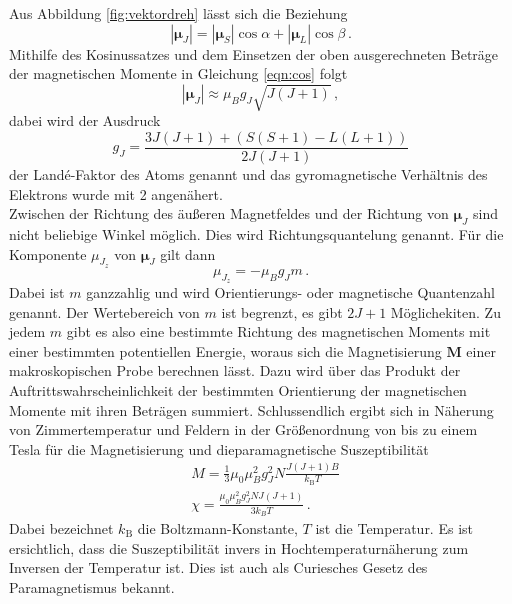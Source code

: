 Aus Abbildung \ref{fig:vektordreh} lässt sich die Beziehung
\begin{equation}
  |\symbf{\mu}_J| = |\symbf{\mu}_S| \cos\alpha + |\symbf{\mu}_L| \cos\beta\,.
  \label{eqn:cos}
\end{equation}
Mithilfe des Kosinussatzes und dem Einsetzen der oben ausgerechneten Beträge der magnetischen Momente in Gleichung
\ref{eqn:cos} folgt
\begin{equation}
  |\symbf{\mu}_J| \approx \mu_B g_J \sqrt{J(J+1)}\,,
\end{equation}
dabei wird der Ausdruck
\begin{equation}
  g_J = \frac{3J(J+1) + (S(S+1)-L(L+1))}{2J(J+1)}
  \label{eqn:lande}
\end{equation}
der Landé-Faktor des Atoms genannt und das gyromagnetische Verhältnis des Elektrons wurde
mit 2 angenähert. \\
Zwischen der Richtung des äußeren Magnetfeldes und der Richtung von $\symbf{\mu}_J$
sind nicht beliebige Winkel möglich. Dies wird Richtungsquantelung genannt. Für die Komponente
$\mu_{J_z}$ von $\symbf{\mu}_J$ gilt dann
\begin{equation}
  \mu_{J_z} = - \mu_B g_J m\,.
\end{equation}
Dabei ist $m$ ganzzahlig und wird Orientierungs- oder magnetische Quantenzahl genannt.
Der Wertebereich von $m$ ist begrenzt, es gibt $2J+1$ Möglichekiten. Zu jedem $m$ gibt es also eine bestimmte Richtung
des magnetischen Moments mit einer bestimmten potentiellen Energie, woraus sich die
Magnetisierung $\symbf{M}$ einer makroskopischen Probe berechnen lässt.
Dazu wird über das Produkt der Auftrittswahrscheinlichkeit der bestimmten
Orientierung der magnetischen Momente mit ihren Beträgen summiert.
Schlussendlich ergibt sich in Näherung von Zimmertemperatur und Feldern in der Größenordnung
von bis zu einem Tesla für die Magnetisierung und dieparamagnetische Suszeptibilität
\begin{align}
  &M = \frac{1}{3} \mu_0 \mu_B^2 g_J^2 N \frac{J(J+1)B}{k_\text{B}T} \,\\
  &\chi = \frac{\mu_0 \mu_B^2 g_J^2 N J (J+1)}{3 k_B T}\,.
\end{align}
Dabei bezeichnet $k_\text{B}$ die Boltzmann-Konstante, $T$ ist die Temperatur.
Es ist ersichtlich, dass die Suszeptibilität invers in Hochtemperaturnäherung
zum Inversen der Temperatur ist. Dies ist auch als Curiesches Gesetz des Paramagnetismus bekannt.

